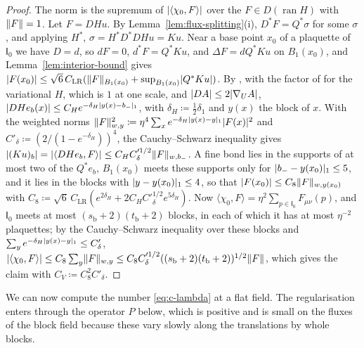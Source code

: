 \documentclass[11pt]{preprint}
\DeclarePairedDelimiter{\abs}{\lvert}{\rvert}
\DeclarePairedDelimiter{\norm}{\lVert}{\rVert}
\numberwithin{equation}{section}
\theoremstyle{definition}
\theoremstyle{remark}
\theoremstyle{plain}
\begin{document}
\begin{proof}
The norm is the supremum of $\abs{\langle\chi_0, F\rangle}$ over the $F \in D(\operatorname{ran}H)$ with $\norm F = 1$. Let $F = DHu$. By Lemma~\ref{lem:flux-splitting}(i), $D^*F = Q^*\sigma$ for some $\sigma$, and applying $H^*$, $\sigma = H^*D^*DHu = Ku$. Near a base point $x_0$ of a plaquette of $\mathsf I_0$ we have $D = d$, so $dF = 0$, $d^*F = Q^*Ku$, and $\Delta F = dQ^*Ku$ on $B_1(x_0)$, and Lemma~\ref{lem:interior-bound} gives $\abs{F(x_0)} \leq \sqrt6\,C_{\mathrm{LR}}(\norm F_{B_1(x_0)} + \sup_{B_1(x_0)}\abs{Q^*Ku})$. By \cite[(3.133), p.~422]{BalabanPBG}, with the factor of \cite[p.~422, ll.~32--33]{BalabanPBG} for the variational $H$, which is $1$ at one scale, and $\abs{DA} \leq 2\abs{\nabla_UA}$, $\abs{DHe_b(x)} \leq C_He^{-\delta_H\abs{y(x) - b_-}_1}$, with $\delta_H \coloneqq \frac12\delta_1$ and $y(x)$ the block of $x$. With the weighted norms $\norm F_{w,y}^2 \coloneqq \eta^4\sum_xe^{-\delta_H\abs{y(x) - y}_1}\abs{F(x)}^2$ and $C'_\delta \coloneqq (2/(1 - e^{-\delta_H}))^4$, the Cauchy--Schwarz inequality gives $\abs{(Ku)_b} = \abs{\langle DHe_b, F\rangle} \leq C_HC'^{1/2}_\delta\norm F_{w,b_-}$. A fine bond lies in the supports of at most two of the $Q^*e_b$, $B_1(x_0)$ meets these supports only for $\abs{b_- - y(x_0)}_1 \leq 5$, and it lies in the blocks with $\abs{y - y(x_0)}_1 \leq 4$, so that $\abs{F(x_0)} \leq C_8\norm F_{w,y(x_0)}$ with $C_8 \coloneqq \sqrt6\,C_{\mathrm{LR}}(e^{2\delta_H} + 2C_HC'^{1/2}_\delta e^{5\delta_H})$. Now $\langle\chi_0, F\rangle = \eta^2\sum_{p \in \mathsf I_0}F_{\mu\nu}(p)$, and $\mathsf I_0$ meets at most $(s_{\mathrm b} + 2)(t_{\mathrm b} + 2)$ blocks, in each of which it has at most $\eta^{-2}$ plaquettes; by the Cauchy--Schwarz inequality over these blocks and $\sum_ye^{-\delta_H\abs{y(x) - y}_1} \leq C'_\delta$, $\abs{\langle\chi_0, F\rangle} \leq C_8\sum_y\norm F_{w,y} \leq C_8C'^{1/2}_\delta((s_{\mathrm b} + 2)(t_{\mathrm b} + 2))^{1/2}\norm F$, which gives the claim with $C_V \coloneqq C_8^2C'_\delta$.
\end{proof}

We can now compute the number \eqref{eq:c-lambda} at a flat field. The regularisation enters through the operator $P$ below, which is positive and is small on the fluxes of the block field because these vary slowly along the translations by whole blocks.
\end{document}
